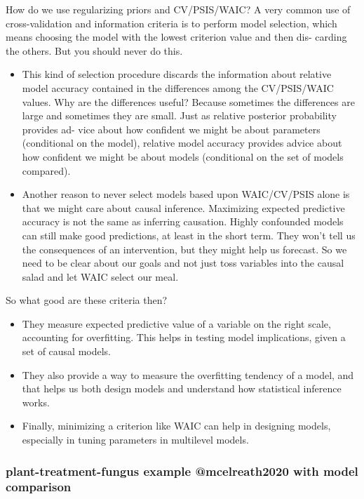 \documentclass[
]{article}
\begin{document}
How do we use regularizing priors and CV/PSIS/WAIC? A very common use of
cross-validation and information criteria is to perform model selection,
which means choosing the model with the lowest criterion value and then
dis- carding the others. But you should never do this.

\begin{itemize}
\item
  This kind of selection procedure discards the information about
  relative model accuracy contained in the differences among the
  CV/PSIS/WAIC values. Why are the differences useful? Because sometimes
  the differences are large and sometimes they are small. Just as
  relative posterior probability provides ad- vice about how confident
  we might be about parameters (conditional on the model), relative
  model accuracy provides advice about how confident we might be about
  models (conditional on the set of models compared).
\item
  Another reason to never select models based upon WAIC/CV/PSIS alone is
  that we might care about causal inference. Maximizing expected
  predictive accuracy is not the same as inferring causation. Highly
  confounded models can still make good predictions, at least in the
  short term. They won't tell us the consequences of an intervention,
  but they might help us forecast. So we need to be clear about our
  goals and not just toss variables into the causal salad and let WAIC
  select our meal.
\end{itemize}

So what good are these criteria then?

\begin{itemize}
\item
  They measure expected predictive value of a variable on the right
  scale, accounting for overfitting. This helps in testing model
  implications, given a set of causal models.
\item
  They also provide a way to measure the overfitting tendency of a
  model, and that helps us both design models and understand how
  statistical inference works.
\item
  Finally, minimizing a criterion like WAIC can help in designing
  models, especially in tuning parameters in multilevel models.
\end{itemize}

\hypertarget{plant-treatment-fungus-example-mcelreath2020-with-model-comparison}{%
\subsubsection{plant-treatment-fungus example @mcelreath2020 with model
comparison}\label{plant-treatment-fungus-example-mcelreath2020-with-model-comparison}}
\end{document}

